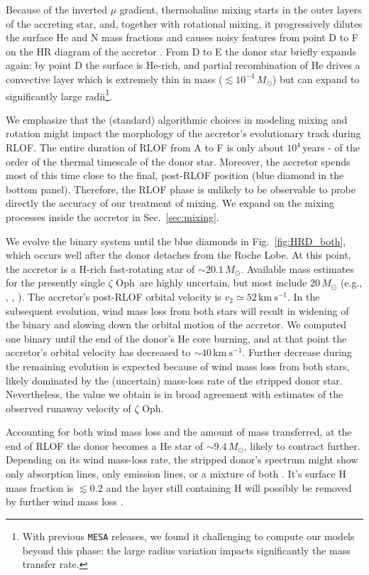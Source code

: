 \documentclass[twocolumn,twocolappendix,trackchanges]{aastex63}
\newcommand{\kms}{{\mathrm{km\ s^{-1}}}}
\DeclareRobustCommand{\Figref}[1]{Fig.~\ref{#1}}
\DeclareRobustCommand{\Secref}[1]{Sec.~\ref{#1}}
\newcommand{\zoph}{$\zeta$ Oph}
\begin{document}
Because of the inverted $\mu$ gradient, thermohaline mixing starts in
the outer layers of the accreting star, and, together with rotational
mixing, it progressively dilutes the surface He and N mass fractions
and causes noisy features from point D to F on the HR diagram of the
accretor \citep[e.g.,][]{cantiello:07}. From D to E the donor star
briefly expands again: by point D the surface is He-rich, and partial
recombination of He drives a convective layer which is extremely thin
in mass ($\lesssim 10^{-4}\,M_\odot$) but can expand to significantly
large radii\footnote{With previous \texttt{MESA} releases, we found it
  challenging to compute our models beyond this phase: the large
  radius variation impacts significantly the mass transfer rate.}.

We emphasize that the (standard) algorithmic choices in
modeling mixing and rotation might impact the morphology of the
accretor's evolutionary track during RLOF. The entire duration of RLOF
from A to F is only about $10^4$\,years - of the order of the thermal timescale of
the donor star. Moreover, the accretor spends most of this time close
to the final, post-RLOF position (blue diamond in the bottom
panel). Therefore, the RLOF phase is unlikely to be observable to
probe directly the accuracy of our treatment of mixing. We expand on
the mixing processes inside the accretor in \Secref{sec:mixing}.

We evolve the binary system until the blue diamonds in
\Figref{fig:HRD_both}, which occurs well after the donor detaches from
the Roche Lobe. At this point, the accretor is a H-rich fast-rotating
star of
$\sim$$20.1\,M_\odot$. Available mass estimates for the presently single \zoph\ are highly uncertain, but most include
$20\,M_\odot$ (e.g., \citealt{hoogerwerf:01}, , \citealt{neuhauser:20}). The accretor's post-RLOF orbital velocity is
$v_2\simeq52\,\kms$. In the subsequent evolution, wind mass loss from both stars will result in widening of the binary and slowing down the orbital motion of the accretor. We computed one binary until the end of the donor's He core burning, and at that point the accretor's orbital velocity has decreased to
$\sim$$40\,\kms$. Further decrease during the remaining evolution
is expected because of wind mass loss from both stars, likely dominated by the
(uncertain) mass-loss rate of the stripped donor star. Nevertheless,
the value we obtain is in broad agreement with estimates of the
observed runaway velocity of \zoph.

Accounting for both wind mass loss and the amount of mass transferred,
at the end of RLOF the donor becomes a He star of
$\sim$$9.4\,M_\odot$, likely to contract further. Depending on its wind mass-loss rate, the stripped donor's spectrum might show only absorption lines, only emission lines, or a mixture of both \citep[e.g.,][]{crowther:07, neugent:17, gotberg:18}. It's surface H mass fraction is $\lesssim
0.2$ and the layer still containing H will possibly be removed by further wind mass loss \citep[e.g.,][]{gotberg:17}.
\end{document}
